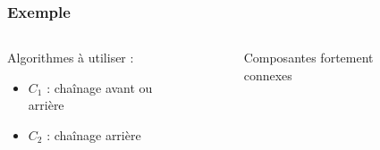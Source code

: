 \begin{frame}
	\frametitle{Exemple}
	\begin{columns}
	\begin{column}{0.45\linewidth}
		Algorithmes à utiliser :
		\begin{itemize}
			\item $C_1$ : chaînage avant ou arrière
			\item $C_2$ : chaînage arrière
		\end{itemize}
	\end{column}
	\vline
	\hfill
	\begin{column}{0.45\linewidth}
		\begin{figure}
		\caption{Composantes fortement connexes}
		\end{figure}
	\end{column}
	\end{columns}
\end{frame}


